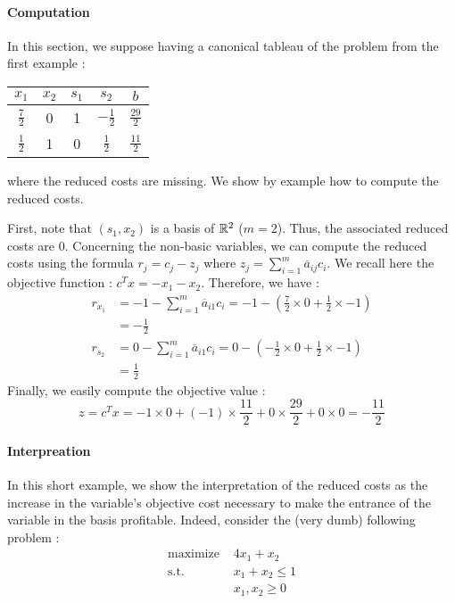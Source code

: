 \paragraph{Computation}
In this section, we suppose having a canonical tableau of the problem from the first example : 
\begin{center}
    \begin{tabular}{cccc|c}
        $x_1$ & $x_2$ & $s_1$ & $s_2$ & $b$ \\\hline
        $\frac 72$ & 0 & 1 & $-\frac 12$ & $\frac{29}2$\\
        $\frac 12$ & 1 & 0 & $\frac 12$ & $\frac{11}2$\\
    \end{tabular}
\end{center} where the reduced costs are missing. We show by example how to compute the reduced costs. 

First, note that $(s_1, x_2)$ is a basis of $\mathbb R^2$ ($m = 2$). Thus, the associated reduced costs are $0$. Concerning the non-basic variables, we can compute the reduced costs using the formula $r_j = c_j - z_j$ where $z_j = \sum_{i=1}^m \overline a_{ij}c_i$. We recall here the objective function : $c^Tx = -x_1 - x_2$. Therefore, we have :
{\small \begin{align*}
    r_{x_1} &= -1 - \sum_{i=1}^m \overline a_{i1}c_i = -1 - \left( \frac 72\times 0 + \frac 12 \times -1 \right)\\
    &= -\frac 12\\
    r_{s_2} &= 0 - \sum_{i=1}^m \overline a_{i1}c_i = 0 - \left( -\frac 12\times 0 + \frac 12 \times -1 \right)\\
    &= \frac 12
\end{align*}}
Finally, we easily compute the objective value :  {\small \[ z = c^Tx = -1 \times 0 + (-1) \times \frac{11}2 + 0 \times \frac{29}2 + 0\times 0 = -\frac{11}{2} \]}

\paragraph{Interpreation}
In this short example, we show the interpretation of the reduced costs as the increase in the variable's objective cost necessary to make the entrance of the variable in the basis profitable. Indeed, consider the (very dumb) following problem :
\begin{align*}
    \textrm{maximize } & 4x_1 + x_2\\
    \textrm{s.t. } & x_1 + x_2 \le 1\\
    & x_1, x_2\ge 0
\end{align*}

